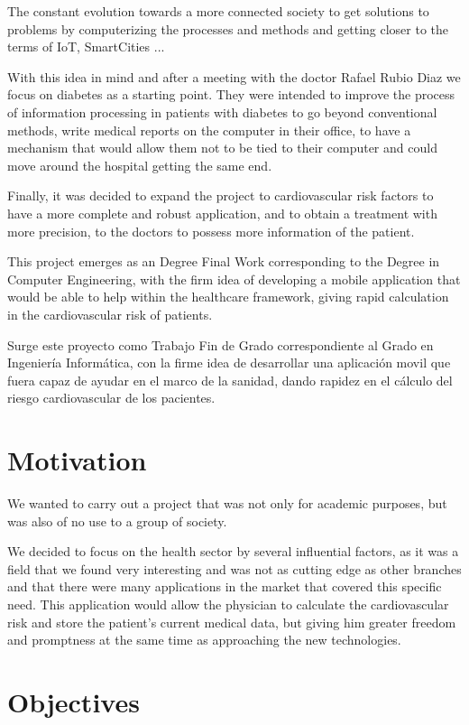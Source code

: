 \documentclass[11pt,spanish,
		listoftables,listoffigures]
		{tfgplantilla}
\begin{document}
The constant evolution towards a more connected society to get solutions to problems by computerizing the processes and methods and getting closer to the terms of IoT, SmartCities ...

With this idea in mind and after a meeting with the doctor Rafael Rubio Diaz we focus on diabetes as a starting point. They were intended to improve the process of information processing in patients with diabetes to go beyond conventional methods, write medical reports on the computer in their office, to have a mechanism that would allow them not to be tied to their computer and could move around the hospital getting the same end.

Finally, it was decided to expand the project to cardiovascular risk factors to have a more complete and robust application, and to obtain a treatment with more precision, to the doctors to possess more information of the patient.

This project emerges as an Degree Final Work corresponding to the Degree in Computer Engineering, with the firm idea of developing a mobile application that would be able to help within the healthcare framework, giving rapid calculation in the cardiovascular risk of patients.

Surge este proyecto como Trabajo Fin de Grado correspondiente al Grado en Ingeniería Informática, con la firme idea de desarrollar una aplicación movil que fuera capaz de ayudar en el marco de la sanidad, dando rapidez en el cálculo del riesgo cardiovascular de los pacientes.

\section{Motivation}

We wanted to carry out a project that was not only for academic purposes, but was also of no use to a group of society.

We decided to focus on the health sector by several influential factors, as it was a field that we found very interesting and was not as cutting edge as other branches and that there were many applications in the market that covered this specific need.
This application would allow the physician to calculate the cardiovascular risk and store the patient's current medical data, but giving him greater freedom and promptness at the same time as approaching the new technologies.

\vfill
\section{Objectives}
\end{document}

